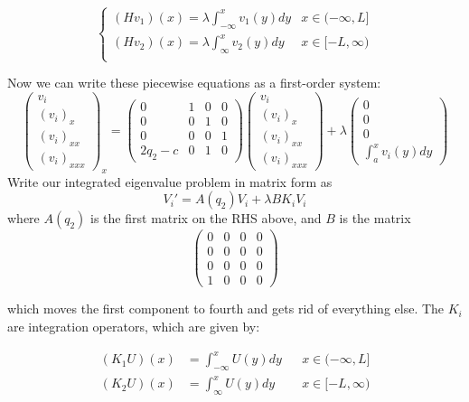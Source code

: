\documentclass[12pt]{article}
\begin{document}
\begin{equation}
\begin{cases}
(Hv_1)(x) = \lambda \int_{-\infty}^x v_1(y) dy & x \in (-\infty, L] \\
(Hv_2)(x) = \lambda \int_{\infty}^x v_2(y) dy & x \in [-L, \infty) \\ 
\end{cases}
\end{equation}

Now we can write these piecewise equations as a first-order system:
\[
\begin{pmatrix}v_i\\(v_i)_x\\(v_i)_{xx}\\(v_i)_{xxx}\end{pmatrix}_x = 
\begin{pmatrix}0 & 1 & 0 & 0 \\ 0 & 0 & 1 & 0 \\ 0 & 0 & 0 & 1 \\ 2q_2 - c & 0 & 1 & 0\end{pmatrix}
\begin{pmatrix}v_i\\(v_i)_x\\(v_i)_{xx}\\(v_i)_{xxx}\end{pmatrix} + \lambda
\begin{pmatrix}0\\0\\0\\\int_{a}^x v_i(y) dy\end{pmatrix}
\]
Write our integrated eigenvalue problem in matrix form as
\[
V_i' = A(q_2) V_i + \lambda B K_i V_i
\]
where $A(q_2)$ is the first matrix on the RHS above, and $B$ is the matrix
\[
\begin{pmatrix}0 & 0 & 0 & 0 \\0 & 0 & 0 & 0 \\0 & 0 & 0 & 0 \\1 & 0 & 0 & 0 \end{pmatrix}
\]

which moves the first component to fourth and gets rid of everything else. The $K_i$ are integration operators, which are given by:

\begin{align*}
(K_1 U)(x) &= \int_{-\infty}^x U(y) dy && x \in (-\infty, L] \\
(K_2 U)(x) &= \int_{\infty}^x U(y) dy && x \in [-L, \infty) \\
\end{align*}
\end{document}
